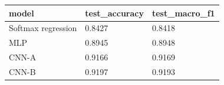\begin{tabular}{lll}
\toprule
model & test\_accuracy & test\_macro\_f1 \\
\midrule
Softmax regression & 0.8427 & 0.8418 \\
MLP & 0.8945 & 0.8948 \\
CNN-A & 0.9166 & 0.9169 \\
CNN-B & 0.9197 & 0.9193 \\
\bottomrule
\end{tabular}